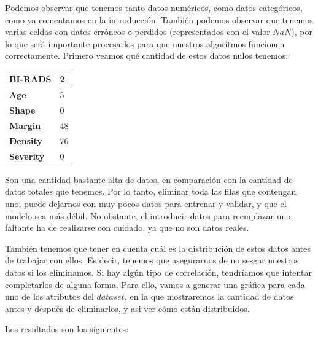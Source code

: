 \documentclass[11pt,a4paper]{article}
\begin{document}
Podemos observar que tenemos tanto datos numéricos, como datos categóricos, como ya comentamos en la introducción. También podemos
observar que tenemos varias celdas con datos erróneos o perdidos (representados con el valor $NaN$), por lo que será importante
procesarlos para que nuestros algoritmos funcionen correctamente. Primero veamos qué cantidad de estos datos nulos tenemos:

\begin{table}[H]
    \centering
    \begin{tabular}{|l|l|}
    \hline
    \multicolumn{1}{|c|}{\textbf{BI-RADS}} & 2 \\ \hline
    \textbf{Age} & 5 \\ \hline
    \textbf{Shape} & 0 \\ \hline
    \textbf{Margin} & 48 \\ \hline
    \textbf{Density} & 76 \\ \hline
    \textbf{Severity} & 0 \\ \hline
    \end{tabular}
\end{table}

Son una cantidad bastante alta de datos, en comparación con la cantidad de datos totales que tenemos. Por lo tanto, eliminar toda
las filas que contengan uno, puede dejarnos con muy pocos datos para entrenar y validar, y que el modelo sea más débil. No obstante,
el introducir datos para reemplazar uno faltante ha de realizarse con cuidado, ya que no son datos reales.

También tenemos que tener en cuenta cuál es la distribución de estos datos antes de trabajar con ellos. Es decir, tenemos que
asegurarnos de no sesgar nuestros datos si los eliminamos. Si hay algún tipo de correlación, tendríamos que intentar completarlos
de alguna forma. Para ello, vamos a generar una gráfica para cada uno de los atributos del $dataset$, en la que mostraremos la
cantidad de datos antes y después de eliminarlos, y asi ver cómo están distribuidos.

\newpage
Los resultados son los siguientes:
\end{document}
